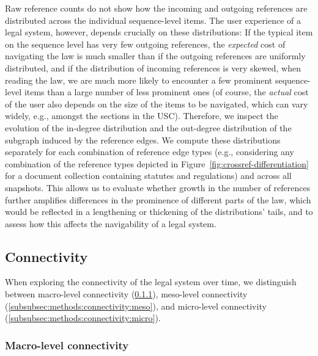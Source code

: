Raw reference counts do not show how the incoming and outgoing references are distributed across the individual sequence-level items. 
The user experience of a legal system, however, depends crucially on these distributions: 
If the typical item on the sequence level has very few outgoing references, the \emph{expected} cost of navigating the law is much smaller than if the outgoing references are uniformly distributed, 
and if the distribution of incoming references is very skewed, when reading the law, we are much more likely to encounter a few prominent sequence-level items than a large number of less prominent ones
(of course, the \emph{actual} cost of the user also depends on the size of the items to be navigated, which can vary widely, e.g., amongst the sections in the USC).
Therefore, we inspect the evolution of the in-degree distribution and the out-degree distribution of the subgraph induced by the reference edges.
We compute these distributions separately for each combination of reference edge types (e.g., considering any combination of the reference types depicted in Figure~\ref{fig:crossref-differentiation} for a document collection containing statutes and regulations) and across all snapshots.
This allows us to evaluate whether growth in the number of references further amplifies differences in the prominence of different parts of the law, 
which would be reflected in a lengthening or thickening of the distributions' tails, and to assess how this affects the navigability of a legal system.

\vspace*{6pt}
\subsection{Connectivity}
\label{subsec:methods:connectivity}

When exploring the connectivity of the legal system over time, we distinguish between macro-level connectivity (\ref{subsubsec:methods:connectivity:macro}), meso-level connectivity (\ref{subsubsec:methods:connectivity:meso}), and micro-level connectivity (\ref{subsubsec:methods:connectivity:micro}). 

\vspace*{6pt}
\subsubsection{Macro-level connectivity}
\label{subsubsec:methods:connectivity:macro}

